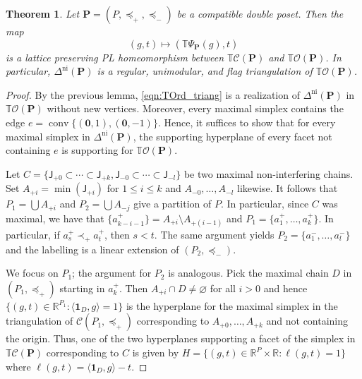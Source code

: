 \documentclass[11pt]{amsart}
\newtheorem{thm}{Theorem}[section]
\theoremstyle{definition}
\begin{document}
\begin{thm}\label{thm:T_iso}
    Let ${\mathbf{P}} = ({P},\preceq_+,\preceq_-)$ be a compatible double poset.
    Then the map 
    \[
        (g,t) \mapsto ({{\mathbb{T}}{\Psi}_{\mathbf{P}}}(g),t)
    \]
    is a lattice preserving PL homeomorphism between ${{\mathbb{T}}{\mathcal{C}({{{\mathbf{P}}}})}}$ and
    ${{\mathbb{T}}{\mathcal{O}({\mathbf{P}})}}$. In particular, ${\Delta^\mathrm{ni}({\mathbf{P}})}$ is a regular,
    unimodular, and flag triangulation of ${{\mathbb{T}}{\mathcal{O}({\mathbf{P}})}}$.
\end{thm}
\begin{proof}
    By the previous lemma, \eqref{eqn:TOrd_triang} is a realization of
    ${\Delta^\mathrm{ni}({\mathbf{P}})}$ in ${{\mathbb{T}}{\mathcal{O}({\mathbf{P}})}}$ without new vertices. Moreover, every
    maximal simplex contains the edge $e = \operatorname{conv}\{({\mathbf{0}},1), ({\mathbf{0}},-1)\}$. Hence,
    it suffices to show that for every maximal simplex in ${\Delta^\mathrm{ni}({\mathbf{P}})}$, the
    supporting hyperplane of every facet not containing $e$ is supporting for
    ${{\mathbb{T}}{\mathcal{O}({\mathbf{P}})}}$.

    Let $C = \{ {\mathsf{J}}_{+0} \subset \cdots \subset {\mathsf{J}}_{+k}, {\mathsf{J}}_{-0}
    \subset \cdots \subset {\mathsf{J}}_{-l}\}$ be two maximal non-interfering
    chains. Set $A_{+i} = \min({\mathsf{J}}_{+i})$ for $1 \le i \le k$ and
    $A_{-0},\dots,A_{-l}$ likewise. It follows that ${P}_1 = \bigcup A_{+i}$
    and ${P}_2 = \bigcup A_{-j}$ give a partition of ${P}$. In particular, since
    $C$ was maximal, we have that $\{a^+_{k-i-1}\} = A_{+i} \setminus
    A_{+(i-1)}$ and ${P}_1 = \{a^+_1,\dots,a^+_k\}$. In particular, if $a^+_s
    \prec_+ a^+_t$, then $s < t$. The same argument yields ${P}_2 =
    \{a^-_1,\dots,a^-_l\}$ and the labelling is a linear extension of
    $({P}_2,\preceq_-)$. 

    We focus on ${P}_1$; the argument for ${P}_2$ is analogous. Pick the maximal
    chain $D$ in $({P}_1,\preceq_+)$ starting in $a^+_k$. Then $A_{+i} \cap D
    \neq {\varnothing}$ for all $i > 0$ and hence $\{(g,t) \in {\mathbb{R}}^{{P}_1}
    :{\langle{{{\mathbf{1}}_D,g}}\rangle} = 1\}$ is the hyperplane for the maximal simplex in the
    triangulation of ${\mathcal{C}({{{P}_1,\preceq_+}})}$ corresponding to
    $A_{+0},\dots,A_{+k}$ and not containing the origin. Thus, one of the two
    hyperplanes supporting a facet of the simplex in ${{\mathbb{T}}{\mathcal{C}({{{\mathbf{P}}}})}}$
    corresponding to $C$ is given by $H = \{ (g,t) \in {\mathbb{R}}^{P} \times {\mathbb{R}} :
    \ell(g,t) = 1 \}$ where $\ell(g,t) = {\langle{{{\mathbf{1}}_D,g}}\rangle} - t$.
    

\end{proof}
\end{document}
